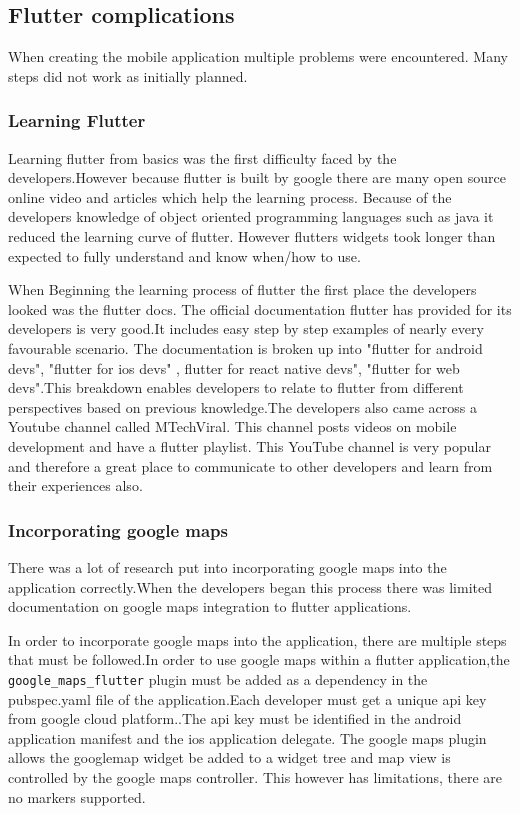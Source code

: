\subsection{Flutter complications}
When creating the mobile application multiple problems were encountered. Many steps did not work as initially planned.
\subsubsection{Learning Flutter}
Learning flutter from basics was the first difficulty faced by the developers.However because flutter is built by google there are many open source online video and articles which help the learning process. Because of the developers knowledge of object oriented programming languages such as java it reduced the learning curve of flutter. However flutters widgets took longer than expected to fully understand and know when/how to use.

When Beginning the learning process of flutter the first place the developers looked was the flutter docs.\cite{flutterdocs} The official documentation flutter has provided for its developers is very good.It includes easy step by step examples of nearly every favourable scenario. The documentation is broken up into "flutter for android devs", "flutter for ios devs" , flutter for react native devs", "flutter for web devs".This breakdown enables developers to relate to flutter from different perspectives based on previous knowledge.The developers also came across a Youtube channel called MTechViral.\cite{channel_youtube} This channel posts videos on mobile development and have a flutter playlist. This YouTube channel is very popular and therefore a great place to communicate to other developers and learn from their experiences also.

\subsubsection{Incorporating google maps}
There was a lot of research put into incorporating google maps into the application correctly.When the developers began this process there was limited documentation on google maps integration to flutter applications.

In order to incorporate google maps into the application, there are multiple steps that must be followed.In order to use google maps within a flutter application,the \texttt{google\_maps\_flutter} plugin must be added as a dependency in the pubspec.yaml file of the application.Each developer must get a unique api key from google cloud platform.\cite{googleCloudMap}.The api key must be identified in the android application manifest and the ios application delegate. The google maps plugin allows the googlemap widget be added to a widget tree and map view is controlled by the google maps controller. This however has limitations, there are no markers supported.

